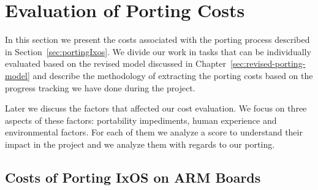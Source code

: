 \newcommand\multirowline[1]{\begin{tabular}{@{}c@{}}#1\end{tabular}}

\chapter{Evaluation of Porting Costs} \label{sec:eval}

%
%
%

In this section we present the costs associated with the porting process
described in Section~\ref{sec:portingIxos}. We divide our work in tasks
that can be individually evaluated based on the revised model discussed in
Chapter~\ref{sec:revised-porting-model} and describe the methodology of
extracting the porting costs based on the progress tracking we have done during
the project.

Later we discuss the factors that affected our cost evaluation. We focus on
three aspects of these factors: portability impediments, human experience and
environmental factors. For each of them we analyze a score to understand their
impact in the project and we analyze them with regards to our porting.

\section{Costs of Porting IxOS on ARM Boards}

